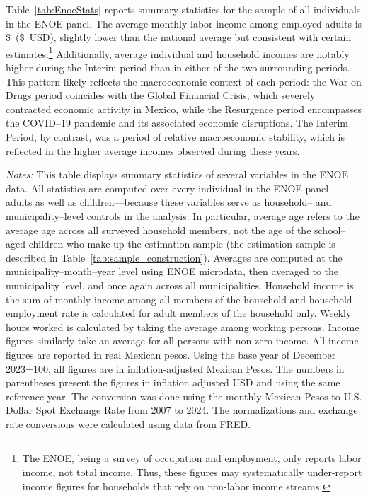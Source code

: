 \documentclass[12pt,letter,english,intoc,bibliography=totoc,index=totoc,BCOR10mm,captions=tableheading,nottitlepage,fleqn]{article}
\theoremstyle{break}
\begin{document}
Table~\ref{tab:EnoeStats} reports summary statistics for the sample of all individuals in the ENOE panel. The average monthly labor income among employed adults is \$\Avgincome\  (\$\AvgincomeUSD\ USD), slightly lower than the national average but consistent with certain estimates.\footnote{The ENOE, being a survey of occupation and employment, only reports labor income, not total income. Thus, these figures may systematically under-report income figures for households that rely on non-labor income streams.} Additionally, average individual and household incomes are notably higher during the Interim period than in either of the two surrounding periods. This pattern likely reflects the macroeconomic context of each period: the War on Drugs period coincides with the Global Financial Crisis, which severely contracted economic activity in Mexico, while the Resurgence period encompasses the COVID--19 pandemic and its associated economic disruptions. The Interim Period, by contrast, was a period of relative macroeconomic stability, which is reflected in the higher average incomes observed during these years.
\begin{table}[H]
\caption{Summary Statistics: ENOE}
\label{tab:EnoeStats}
\centering
\footnotesize

\vspace{2mm}
\begin{minipage}{0.95\linewidth}
\scriptsize \singlespacing
\textit{Notes:} This table displays summary statistics of several variables in the ENOE data. All statistics are computed over every individual in the ENOE panel---adults as well as children---because these variables serve as household-- and municipality--level controls in the analysis. In particular, average age refers to the average age across all surveyed household members, not the age of the school--aged children who make up the estimation sample (the estimation sample is described in Table~\ref{tab:sample_construction}). Averages are computed at the municipality--month--year level using ENOE microdata, then averaged to the municipality level, and once again across all municipalities. Household income is the sum of monthly income among all members of the household and household employment rate is calculated for adult members of the household only. Weekly hours worked is calculated by taking the average among working persons. Income figures similarly take an average for all persons with non-zero income. All income figures are reported in real Mexican pesos. Using the base year of December 2023=100, all figures are in inflation-adjusted Mexican Pesos. The numbers in parentheses present the figures in inflation adjusted USD and using the same reference year. The conversion was done using the monthly Mexican Pesos to U.S. Dollar Spot Exchange Rate from 2007 to 2024. The normalizations and exchange rate conversions were calculated using data from FRED.
\end{minipage}
\end{table}
\end{document}
